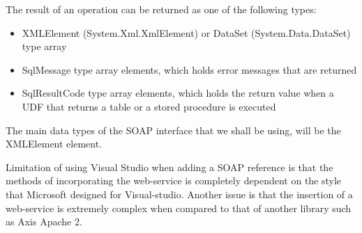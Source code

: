 The result of an operation can be returned  as one of the following types: 
\begin{itemize}
	\item XMLElement (System.Xml.XmlElement) or DataSet (System.Data.DataSet) type array 
	
	\item SqlMessage type array elements, which holds error messages that are returned
	
	\item SqlResultCode type array elements, which holds the return value when a UDF that returns a table or a stored procedure is executed 
\end{itemize}

The main data types of the SOAP interface that we shall be using, will be the XMLElement element.

Limitation of using Visual Studio when adding a SOAP reference is that the methods of incorporating the web-service is completely dependent on the style that Microsoft designed for Visual-studio. Another issue is that the insertion of a web-service is extremely complex when compared to that of another library such as Axis Apache 2. 
